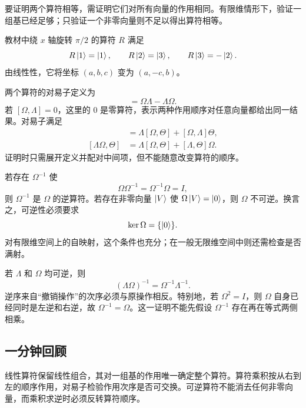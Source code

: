 要证明两个算符相等，需证明它们对所有向量的作用相同。有限维情形下，验证一组基已经足够；只验证一个非零向量则不足以得出算符相等。

教材中绕 $x$ 轴旋转 $\pi/2$ 的算符 $R$ 满足
\[
  R\left|1\right\rangle=\left|1\right\rangle,\qquad
  R\left|2\right\rangle=\left|3\right\rangle,\qquad
  R\left|3\right\rangle=-\left|2\right\rangle.
\]
由线性性，它将坐标 $(a,b,c)$ 变为 $(a,-c,b)$。


两个算符的对易子定义为
\begin{equation}
  [\Omega,\Lambda]=\Omega\Lambda-\Lambda\Omega.
  \label{eq:QM-C01-S05-commutator}
\end{equation}
若 $[\Omega,\Lambda]=0$，这里的 $0$ 是零算符，表示两种作用顺序对任意向量都给出同一结果。对易子满足
\begin{align*}
  [\Omega,\Lambda\Theta]
  &=\Lambda[\Omega,\Theta]+[\Omega,\Lambda]\Theta,\\
  [\Lambda\Omega,\Theta]
  &=\Lambda[\Omega,\Theta]+[\Lambda,\Theta]\Omega.
\end{align*}
证明时只需展开定义并配对中间项，但不能随意改变算符的顺序。


若存在 $\Omega^{-1}$ 使
\begin{equation}
  \Omega\Omega^{-1}=\Omega^{-1}\Omega=I,
  \label{eq:QM-C01-S05-inverse}
\end{equation}
则 $\Omega^{-1}$ 是 $\Omega$ 的逆算符。若存在非零向量 $\left|V\right\rangle$ 使 $\Omega\left|V\right\rangle=\left|0\right\rangle$，则 $\Omega$ 不可逆。换言之，可逆性必须要求
\[
  \ker\Omega=\{\left|0\right\rangle\}.
\]
对有限维空间上的自映射，这个条件也充分；在一般无限维空间中则还需检查是否满射。

若 $\Lambda$ 和 $\Omega$ 均可逆，则
\begin{equation}
  (\Lambda\Omega)^{-1}=\Omega^{-1}\Lambda^{-1}.
  \label{eq:QM-C01-S05-product-inverse}
\end{equation}
逆序来自“撤销操作”的次序必须与原操作相反。特别地，若 $\Omega^2=I$，则 $\Omega$ 自身已经同时是左逆和右逆，故 $\Omega^{-1}=\Omega$。这一证明不能先假设 $\Omega^{-1}$ 存在再在等式两侧相乘。

\subsection{一分钟回顾}

线性算符保留线性组合，其对一组基的作用唯一确定整个算符。算符乘积按从右到左的顺序作用，对易子检验作用次序是否可交换。可逆算符不能消去任何非零向量，而乘积求逆时必须反转算符顺序。

